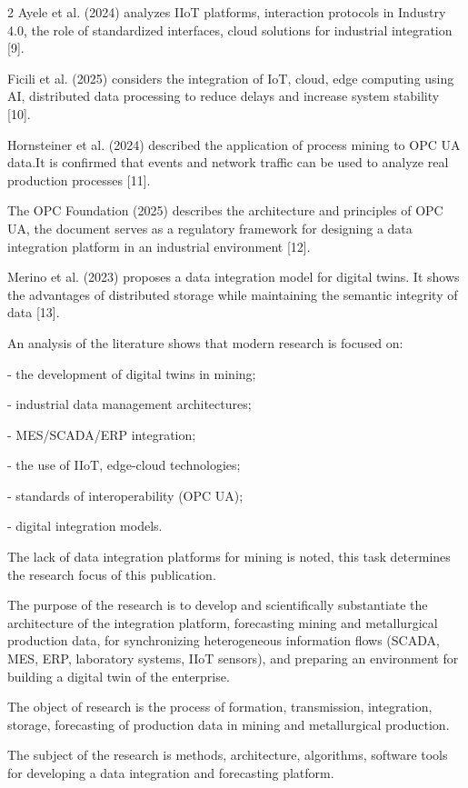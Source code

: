 \begin{multicols}{2}
Ayele et al. (2024) analyzes IIoT platforms, interaction protocols in
Industry 4.0, the role of standardized interfaces, cloud solutions for
industrial integration {[}9{]}.

Ficili et al. (2025) considers the integration of IoT, cloud, edge
computing using AI, distributed data processing to reduce delays and
increase system stability {[}10{]}.

Hornsteiner et al. (2024) described the application of process mining to
OPC UA data.It is confirmed that events and network traffic can be used
to analyze real production processes {[}11{]}.

The OPC Foundation (2025) describes the architecture and principles of
OPC UA, the document serves as a regulatory framework for designing a
data integration platform in an industrial environment {[}12{]}.

Merino et al. (2023) proposes a data integration model for digital
twins. It shows the advantages of distributed storage while maintaining
the semantic integrity of data {[}13{]}.

An analysis of the literature shows that modern research is focused on:

- the development of digital twins in mining;

- industrial data management architectures;

- MES/SCADA/ERP integration;

- the use of IIoT, edge-cloud technologies;

- standards of interoperability (OPC UA);

- digital integration models.

The lack of data integration platforms for mining is noted, this task
determines the research focus of this publication.

The purpose of the research is to develop and scientifically
substantiate the architecture of the integration platform, forecasting
mining and metallurgical production data, for synchronizing
heterogeneous information flows (SCADA, MES, ERP, laboratory systems,
IIoT sensors), and preparing an environment for building a digital twin
of the enterprise.

The object of research is the process of formation, transmission,
integration, storage, forecasting of production data in mining and
metallurgical production.

The subject of the research is methods, architecture, algorithms,
software tools for developing a data integration and forecasting
platform.


\end{multicols}
